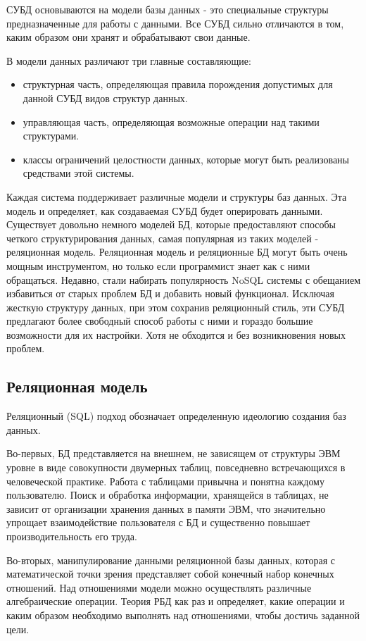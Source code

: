 СУБД основываются на модели базы данных - это специальные структуры предназначенные для работы с данными. Все СУБД сильно отличаются в том, каким образом они хранят и обрабатывают свои данные.

В модели данных различают три главные составляющие:
\begin{itemize}
	\item структурная часть, определяющая правила порождения допустимых для данной СУБД видов структур данных.
	\item управляющая часть, определяющая возможные операции над такими структурами.
	\item классы ограничений целостности данных, которые могут быть реализованы средствами этой системы.
\end{itemize}


Каждая система поддерживает различные модели и структуры баз данных. Эта модель и определяет, как создаваемая СУБД будет оперировать данными. Существует довольно немного моделей БД, которые предоставляют способы четкого структурирования данных, самая популярная из таких моделей - реляционная модель.
Реляционная модель и реляционные БД могут быть очень мощным инструментом, но только если программист знает как с ними обращаться. Недавно, стали набирать популярность NoSQL системы с обещанием избавиться от старых проблем БД и добавить новый функционал. Исключая жесткую структуру данных, при этом сохранив реляционный стиль, эти СУБД предлагают более свободный способ работы с ними и гораздо большие возможности для их настройки. Хотя не обходится и без возникновения новых проблем.

\subsection{Реляционная модель}
Реляционный (SQL) подход обозначает определенную идеологию создания баз данных.

Во-первых, БД представляется на внешнем, не зависящем от структуры ЭВМ уровне в виде совокупности двумерных таблиц, повседневно встречающихся в человеческой практике. Работа с таблицами привычна и понятна каждому пользователю. Поиск и обработка информации, хранящейся в таблицах, не зависит от организации хранения данных в памяти ЭВМ, что значительно упрощает взаимодействие пользователя с БД и существенно повышает производительность его труда.

Во-вторых, манипулирование данными реляционной базы данных, которая с математической точки зрения представляет собой конечный набор конечных отношений. Над отношениями модели можно осуществлять различные алгебраические операции. Теория РБД как раз и определяет, какие операции и каким образом необходимо выполнять над отношениями, чтобы достичь заданной цели.

